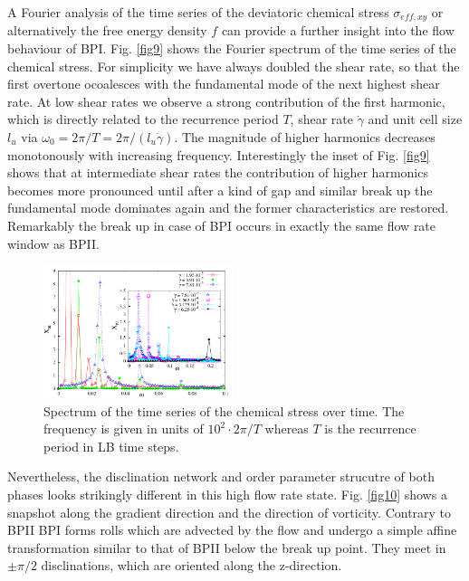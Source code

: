 \documentclass[aps,pre,onecolumn,groupedaddress]{revtex4-1}
\begin{document}
A Fourier analysis of the time series of the deviatoric chemical stress $\sigma_{eff,xy}$ or alternatively the free energy density $f$ can provide a further insight into the flow behaviour of BPI.
Fig. \ref{fig9} shows the Fourier spectrum of the time series of the chemical stress.
For simplicity we have always doubled the shear rate, so that the first overtone ocoalesces with the fundamental mode of the next highest shear rate. 
At low shear rates we observe a strong contribution of the first harmonic, which is directly related to the recurrence period $T$, shear rate $\dot{\gamma}$ and unit cell size $l_{u}$ via $\omega_0=2\pi/T=2\pi/(l_{u}\dot{\gamma})$.
The magnitude of higher harmonics decreases monotonously with increasing frequency.
Interestingly the inset of Fig. \ref{fig9} shows that at intermediate shear rates the contribution of higher harmonics becomes more pronounced until after a kind of gap and similar break up the fundamental mode dominates again and the former characteristics are restored.
Remarkably the break up in case of BPI occurs in exactly the same flow rate window as BPII.

\begin{figure}[h]
\includegraphics[width=0.495\textwidth]{spectrum_bp1.pdf}
\caption{Spectrum of the time series of the chemical stress over time. The frequency is given in units of $10^2\cdot 2\pi/T$ whereas $T$ is the recurrence period in LB time steps.}
\label{bp1-spec}
\end{figure}

Nevertheless, the disclination network and order parameter strucutre of both phases looks strikingly different in this high flow rate state.
Fig. \ref{fig10} shows a snapshot along the gradient direction and the direction of vorticity.
Contrary to BPII BPI forms rolls which are advected by the flow and undergo a simple affine transformation similar to that of BPII below the break up point.
They meet in $\pm\pi/2$ disclinations, which are oriented along the z-direction.
\end{document}
